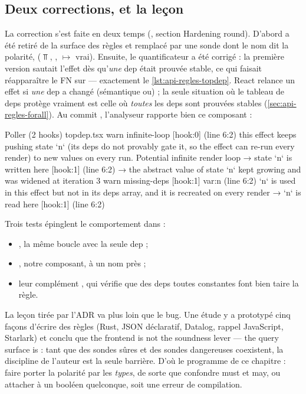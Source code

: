 \subsection{Deux corrections, et la leçon}

La correction s'est faite en deux temps (, section \og Hardening round\fg). D'abord  a été retiré de la surface des règles et remplacé par une sonde dont le nom dit la polarité,  ($\Top$, ,  $\mapsto$ vrai). Ensuite, le quantificateur a été corrigé : la première version sautait l'effet dès qu'\emph{une} dep était prouvée stable, ce qui faisait réapparaître le FN sur  --- exactement le \cref{lst:api-regles-topdep}. React relance un effet si \emph{une} dep a changé (sémantique \og ou\fg) ; la seule situation où le tableau de deps protège vraiment est celle où \emph{toutes} les deps sont prouvées stables (\cref{sec:api-regles-forall}). Au commit \snapshotCommit, l'analyseur rapporte bien ce composant :

\begin{sortie}
  Poller  (2 hooks)  topdep.tsx
    warn   infinite-loop  [hook:0]  (line 6:2)  this effect keeps pushing state `n` (its deps do not provably gate it, so the effect can re-run every render) to new values on every run. Potential infinite render loop
       → state `n` is written here [hook:1] (line 6:2)
       → the abstract value of state `n` kept growing and was widened at iteration 3
    warn   missing-deps  [hook:1]  var:n  (line 6:2)  `n` is used in this effect but not in its deps array, and it is recreated on every render
       → `n` is read here [hook:1] (line 6:2)
\end{sortie}

Trois tests épinglent le comportement dans  :
\begin{itemize}
  \item {}, la même boucle avec la seule dep  ;
  \item {}, notre composant, à un nom près ;
  \item leur complément , qui vérifie que des deps toutes constantes font bien taire la règle.
\end{itemize}

La leçon tirée par l'ADR va plus loin que le bug. Une étude y a prototypé cinq façons d'écrire des règles (Rust, JSON déclaratif, Datalog, rappel JavaScript, Starlark) et conclu que \og the frontend is not the soundness lever --- the query surface is\fg{} : tant que des sondes sûres et des sondes dangereuses coexistent, la discipline de l'auteur est la seule barrière. D'où le programme de ce chapitre : faire porter la polarité par les \emph{types}, de sorte que confondre must et may, ou attacher  à un booléen quelconque, soit une erreur de compilation.

